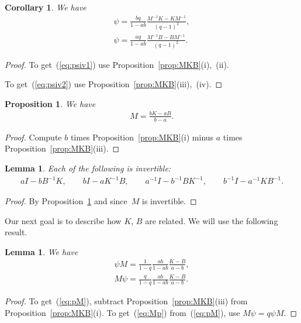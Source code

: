 \documentclass[pdftex]{sigma}
\numberwithin{equation}{section}
\newtheorem{Corollary}[Theorem]{Corollary}
\newtheorem{Lemma}[Theorem]{Lemma}
\newtheorem{Proposition}[Theorem]{Proposition}
\begin{document}
\begin{Corollary} We have
\begin{gather}
\psi = \frac{bq}{1-ab} \frac{M^{-1}K-KM^{-1}}{(q-1)^2},\label{eq:psiv1}\\
\psi = \frac{aq}{1-ab} \frac{M^{-1}B-BM^{-1}}{(q-1)^2}.\label{eq:psiv2}
\end{gather}
\end{Corollary}
\begin{proof} To get~(\ref{eq:psiv1}) use
Proposition~\ref{prop:MKB}(i),~(ii).

To get~(\ref{eq:psiv2}) use Proposition~\ref{prop:MKB}(iii),~(iv).
\end{proof}

\begin{Proposition}\label{prop:KBgivesM}
We have
\begin{gather*}
M = \frac{bK-aB}{b-a}.
\end{gather*}
\end{Proposition}
\begin{proof}
Compute $b$ times
Proposition~\ref{prop:MKB}(i)
minus $a$ times
Proposition~\ref{prop:MKB}(iii).
\end{proof}

\begin{Lemma}\label{lem:denom}
Each of the following is invertible:
\begin{gather*}
aI - bB^{-1}K, \qquad
bI - aK^{-1}B, \qquad
a^{-1}I - b^{-1}BK^{-1}, \qquad
b^{-1}I - a^{-1}KB^{-1}.
\end{gather*}
\end{Lemma}
\begin{proof} By
Proposition~\ref{prop:KBgivesM}
and since~$M$ is invertible.
\end{proof}

Our next goal is to describe how $K$, $B$ are related.
We will use the following result.

\begin{Lemma}\label{prop:pM}
We have
\begin{gather}
\psi M = \frac{1}{1-q} \frac{ab}{1-ab} \frac{K-B}{a-b},\label{eq:pM}\\
M \psi = \frac{q}{1-q} \frac{ab}{1-ab} \frac{K-B}{a-b}.\label{eq:Mp}
\end{gather}
\end{Lemma}
\begin{proof} To get~(\ref{eq:pM}), subtract
Proposition~\ref{prop:MKB}(iii) from
Proposition~\ref{prop:MKB}(i).
To get~(\ref{eq:Mp}) from~(\ref{eq:pM}), use $M\psi = q \psi M$.
\end{proof}
\end{document}
